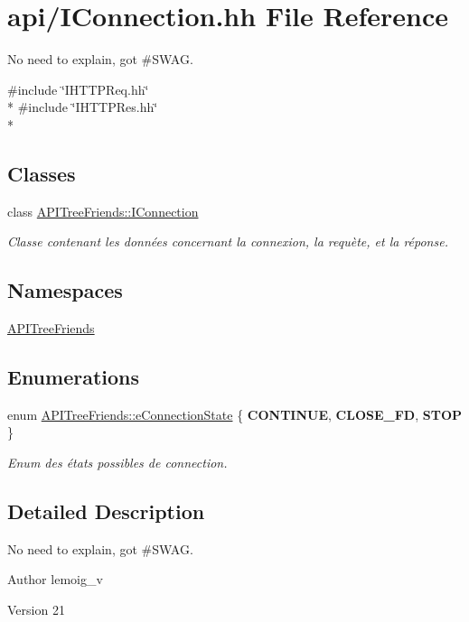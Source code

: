\hypertarget{_i_connection_8hh}{}\section{api/\+I\+Connection.hh File Reference}
\label{_i_connection_8hh}


No need to explain, got \#\+S\+W\+A\+G.  


{\ttfamily \#include \char`\"{}I\+H\+T\+T\+P\+Req.\+hh\char`\"{}}\\*
{\ttfamily \#include \char`\"{}I\+H\+T\+T\+P\+Res.\+hh\char`\"{}}\\*
\subsection*{Classes}
\begin{DoxyCompactItemize}
\item 
class \hyperlink{class_a_p_i_tree_friends_1_1_i_connection}{A\+P\+I\+Tree\+Friends\+::\+I\+Connection}
\begin{DoxyCompactList}\small\item\em Classe contenant les données concernant la connexion, la requète, et la réponse. \end{DoxyCompactList}\end{DoxyCompactItemize}
\subsection*{Namespaces}
\begin{DoxyCompactItemize}
\item 
 \hyperlink{namespace_a_p_i_tree_friends}{A\+P\+I\+Tree\+Friends}
\end{DoxyCompactItemize}
\subsection*{Enumerations}
\begin{DoxyCompactItemize}
\item 
\hypertarget{namespace_a_p_i_tree_friends_a746fed077303e8587bfa0e8f2dbf4997}{}enum \hyperlink{namespace_a_p_i_tree_friends_a746fed077303e8587bfa0e8f2dbf4997}{A\+P\+I\+Tree\+Friends\+::e\+Connection\+State} \{ {\bfseries C\+O\+N\+T\+I\+N\+U\+E}, 
{\bfseries C\+L\+O\+S\+E\+\_\+\+F\+D}, 
{\bfseries S\+T\+O\+P}
 \}\label{namespace_a_p_i_tree_friends_a746fed077303e8587bfa0e8f2dbf4997}

\begin{DoxyCompactList}\small\item\em Enum des états possibles de connection. \end{DoxyCompactList}\end{DoxyCompactItemize}


\subsection{Detailed Description}
No need to explain, got \#\+S\+W\+A\+G. 

\begin{DoxyAuthor}{Author}
lemoig\+\_\+v 
\end{DoxyAuthor}
\begin{DoxyVersion}{Version}
21 
\end{DoxyVersion}
